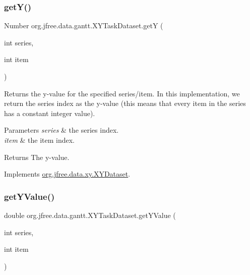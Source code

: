 \mbox{\label{classorg_1_1jfree_1_1data_1_1gantt_1_1_x_y_task_dataset_af647b3b2fe8439c794156c0004fc3234}} 
\subsubsection{\texorpdfstring{get\+Y()}{getY()}}
{\footnotesize\ttfamily Number org.\+jfree.\+data.\+gantt.\+X\+Y\+Task\+Dataset.\+getY (\begin{DoxyParamCaption}\item[{int}]{series,  }\item[{int}]{item }\end{DoxyParamCaption})}

Returns the y-\/value for the specified series/item. In this implementation, we return the series index as the y-\/value (this means that every item in the series has a constant integer value).


\begin{DoxyParams}{Parameters}
{\em series} & the series index. \\
\hline
{\em item} & the item index.\\
\hline
\end{DoxyParams}
\begin{DoxyReturn}{Returns}
The y-\/value. 
\end{DoxyReturn}


Implements \mbox{\hyperlink{interfaceorg_1_1jfree_1_1data_1_1xy_1_1_x_y_dataset_aa915867221e0f94021bad3140db5254e}{org.\+jfree.\+data.\+xy.\+X\+Y\+Dataset}}.

\mbox{\label{classorg_1_1jfree_1_1data_1_1gantt_1_1_x_y_task_dataset_a5e6056162609e273bff52db664ee8bb2}} 
\subsubsection{\texorpdfstring{get\+Y\+Value()}{getYValue()}}
{\footnotesize\ttfamily double org.\+jfree.\+data.\+gantt.\+X\+Y\+Task\+Dataset.\+get\+Y\+Value (\begin{DoxyParamCaption}\item[{int}]{series,  }\item[{int}]{item }\end{DoxyParamCaption})}

